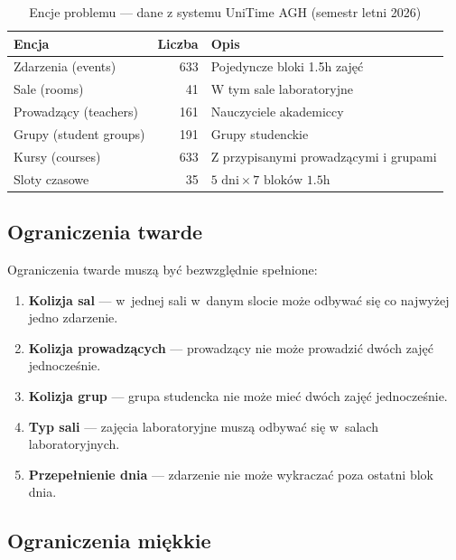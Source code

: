 \documentclass{common/sprawozdanie-agh}
\begin{document}
\begin{table}[H]
\centering
\begin{tabularx}{\textwidth}{lrX}
\toprule
\textbf{Encja} & \textbf{Liczba} & \textbf{Opis} \\
\midrule
Zdarzenia (events)       & 633  & Pojedyncze bloki 1.5h zajęć \\
Sale (rooms)             & 41   & W tym sale laboratoryjne \\
Prowadzący (teachers)    & 161  & Nauczyciele akademiccy \\
Grupy (student groups)   & 191  & Grupy studenckie \\
Kursy (courses)          & 633  & Z przypisanymi prowadzącymi i grupami \\
Sloty czasowe            & 35   & $5 \text{ dni} \times 7 \text{ bloków 1.5h}$ \\
\bottomrule
\end{tabularx}
\caption{Encje problemu --- dane z systemu UniTime AGH (semestr letni 2026)}
\label{tab:entities}
\end{table}

\subsection{Ograniczenia twarde}

Ograniczenia twarde muszą być bezwzględnie spełnione:

\begin{enumerate}
    \item \textbf{Kolizja sal} --- w~jednej sali w~danym slocie może odbywać się co najwyżej jedno zdarzenie.
    \item \textbf{Kolizja prowadzących} --- prowadzący nie może prowadzić dwóch zajęć jednocześnie.
    \item \textbf{Kolizja grup} --- grupa studencka nie może mieć dwóch zajęć jednocześnie.
    \item \textbf{Typ sali} --- zajęcia laboratoryjne muszą odbywać się w~salach laboratoryjnych.
    \item \textbf{Przepełnienie dnia} --- zdarzenie nie może wykraczać poza ostatni blok dnia.
\end{enumerate}

\subsection{Ograniczenia miękkie}
\end{document}

